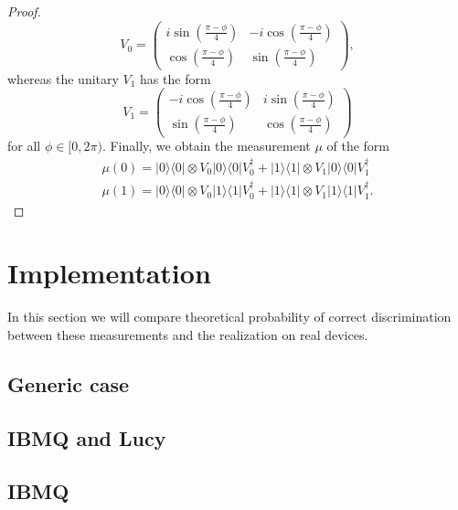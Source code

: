 \documentclass[preprint,12pt, a4paper]{elsarticle}
\newcommand{\ket}[1]{\ensuremath{|#1\rangle}}
\newcommand{\bra}[1]{\ensuremath{\langle#1|}}
\newcommand{\ketbra}[2]{\ensuremath{\ket{#1}\bra{#2}}}
\newcommand{\proj}[1]{\ensuremath{\ketbra{#1}{#1}}}
\newcommand{\1}{{\rm 1\hspace{-0.9mm}l}}
\begin{document}
\begin{proof}
\begin{equation}
V_0 = \left(
\begin{array}{cc}i \sin\left( \frac{\pi - \phi}{4} \right)&-i 
\cos\left( \frac{\pi - \phi}{4} \right)\\ \cos\left( \frac{\pi - 
\phi}{4}\right)& \sin\left( \frac{\pi - \phi}{4} \right)
\end{array}
\right),
\end{equation}
whereas the unitary  $V_1$  has the form
\begin{equation}
V_1 = \left(\begin{array}{cc}-i \cos\left(\frac{\pi - \phi}{4}\right) &i 
\sin\left( \frac{\pi - \phi}{4}\right)\\\sin\left( \frac{\pi - \phi}{4} 
\right) &  \cos\left( \frac{\pi - \phi}{4} \right) \end{array}\right)
\end{equation}
for all $\phi \in [0,2\pi)$. 
Finally, we obtain the measurement $\mu$ of the form
\begin{equation}
\begin{split}
\mu(0) = \proj{0} \otimes V_0 \proj{0} V_0^\dagger +  \proj{1} \otimes V_1 
\proj{0} V_1^\dagger  \\ 
\mu(1) = \proj{0} \otimes V_0 \proj{1} V_0^\dagger +  \proj{1} \otimes V_1 
\proj{1} V_1^\dagger.  
\end{split}
\end{equation} 



\end{proof}


\section{Implementation}
In this section we will compare theoretical probability of correct 
discrimination between these measurements and the realization on real devices.

\subsection{Generic case}

\subsection{IBMQ and Lucy}

\subsection{IBMQ}
\end{document}
